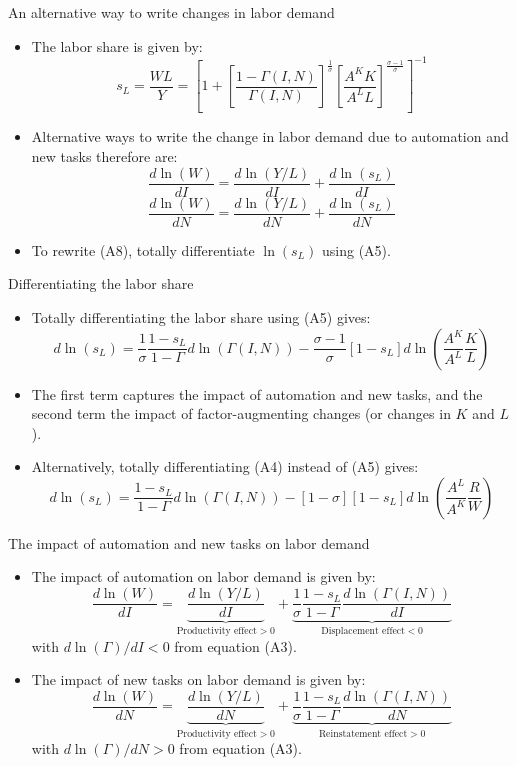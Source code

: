 \documentclass[notes=show]{beamer}
\begin{document}
\begin{frame}{An alternative way to write changes in labor demand}
\begin{itemize}
\item The labor share is given by:
\[
s_{L} = \frac{WL}{Y} =  \left[ 1+ [\frac{1-\Gamma(I,N)}{\Gamma(I,N)}]^{\frac{1}{\sigma}} [\frac{A^{K}K}{A^{L}L}]^{\frac{\sigma-1}{\sigma}} \right]^{-1} \tag{A5}
\]
\item Alternative ways to write the change in labor demand due to automation and new tasks therefore are:
\[
\frac{d \ln (W)}{dI} = \frac{d \ln (Y/L)}{dI} + \frac{d \ln (s_{L})}{dI} \tag{A8} \label{eqA8}
\]
\[
\frac{d \ln (W)}{dN} = \frac{d \ln (Y/L)}{dN} + \frac{d \ln (s_{L})}{dN} 
\]
\item To rewrite (A8), totally differentiate $ \ln (s_{L})$ using (A5).
\end{itemize}
\end{frame}

\begin{frame}{Differentiating the labor share}
\begin{itemize}
\item Totally differentiating the labor share using (A5) gives:
\[
d \ln (s_{L}) = \frac{1}{\sigma} \frac{1-s_{L}}{1- \Gamma} d \ln (\Gamma(I,N)) - \frac{\sigma -1}{\sigma} [1-s_{L}] d \ln (\frac{A^{K}}{A^{L}}\frac{K}{L})
\]
\item The first term captures the impact of automation and new tasks, and the second term the impact of factor-augmenting changes (or changes in $K$ and $L$). \medskip
\item Alternatively, totally differentiating (A4) instead of (A5) gives:
\[
d \ln (s_{L}) = \frac{1-s_{L}}{1- \Gamma} d \ln (\Gamma(I,N)) - [1- \sigma] [1-s_{L}] d \ln (\frac{A^{L}}{A^{K}}\frac{R}{W})
\]
\end{itemize}
\end{frame}

\begin{frame}{The impact of automation and new tasks on labor demand}
\begin{itemize}
\item The impact of automation on labor demand is given by:
\[
\frac{d \ln (W)}{dI} = \underbrace{\frac{d \ln (Y/L)}{dI}}_{\text{Productivity effect} >0} + \underbrace{\frac{1}{\sigma} \frac{1-s_{L}}{1- \Gamma} \frac{d \ln (\Gamma(I,N))}{dI}}_{\text{Displacement effect}<0}
\]
with $d \ln (\Gamma) / dI <0$ from equation (A3).
\item The impact of new tasks on labor demand is given by:
\[
\frac{d \ln (W)}{dN} = \underbrace{\frac{d \ln (Y/L)}{dN}}_{\text{Productivity effect}>0} + \underbrace{\frac{1}{\sigma} \frac{1-s_{L}}{1- \Gamma} \frac{d \ln (\Gamma(I,N))}{dN}}_{\text{Reinstatement effect}>0}
\]
with $d \ln (\Gamma) / dN >0$ from equation (A3).
\end{itemize}
\end{frame}
\end{document}
